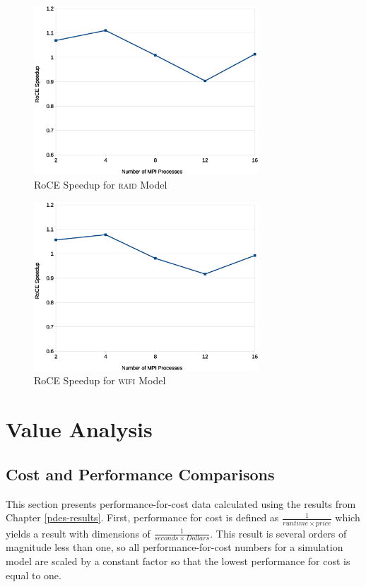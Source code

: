 \documentclass[11pt]{book}
\begin{document}
\begin{figure}
\centering
\includegraphics[width=0.75\textwidth]{raid_speedup}
\caption{RoCE Speedup for \textsc{raid} Model}\label{raid-speedup}
\end{figure}

\begin{figure}
\centering
\includegraphics[width=0.75\textwidth]{wifi_speedup}
\caption{RoCE Speedup for \textsc{wifi} Model}\label{wifi-speedup}
\end{figure}


\chapter{Value Analysis}\label{analysis}

\section{Cost and Performance Comparisons}

This section presents performance-for-cost data calculated using the results from Chapter
\ref{pdes-results}.  First, performance for cost is defined as $\frac{1}{runtime \times
  price}$ which yields a result with dimensions of $\frac{1}{seconds \times Dollars}$.
This result is several orders of magnitude less than one, so all performance-for-cost
numbers for a simulation model are scaled by a constant factor so that the lowest
performance for cost is equal to one.
\end{document}
